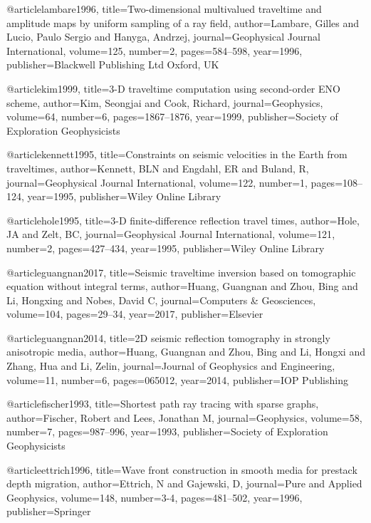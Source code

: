 @article{lambare1996,
  title={Two-dimensional multivalued traveltime and amplitude maps by uniform sampling of a ray field},
  author={Lambare, Gilles and Lucio, Paulo Sergio and Hanyga, Andrzej},
  journal={Geophysical Journal International},
  volume={125},
  number={2},
  pages={584--598},
  year={1996},
  publisher={Blackwell Publishing Ltd Oxford, UK}
}

@article{kim1999,
  title={3-D traveltime computation using second-order ENO scheme},
  author={Kim, Seongjai and Cook, Richard},
  journal={Geophysics},
  volume={64},
  number={6},
  pages={1867--1876},
  year={1999},
  publisher={Society of Exploration Geophysicists}
}

@article{kennett1995,
  title={Constraints on seismic velocities in the Earth from traveltimes},
  author={Kennett, BLN and Engdahl, ER and Buland, R},
  journal={Geophysical Journal International},
  volume={122},
  number={1},
  pages={108--124},
  year={1995},
  publisher={Wiley Online Library}
}


@article{hole1995,
  title={3-D finite-difference reflection travel times},
  author={Hole, JA and Zelt, BC},
  journal={Geophysical Journal International},
  volume={121},
  number={2},
  pages={427--434},
  year={1995},
  publisher={Wiley Online Library}
}


@article{guangnan2017,
  title={Seismic traveltime inversion based on tomographic equation without integral terms},
  author={Huang, Guangnan and Zhou, Bing and Li, Hongxing and Nobes, David C},
  journal={Computers \& Geosciences},
  volume={104},
  pages={29--34},
  year={2017},
  publisher={Elsevier}
}

@article{guangnan2014,
  title={2D seismic reflection tomography in strongly anisotropic media},
  author={Huang, Guangnan and Zhou, Bing and Li, Hongxi and Zhang, Hua and Li, Zelin},
  journal={Journal of Geophysics and Engineering},
  volume={11},
  number={6},
  pages={065012},
  year={2014},
  publisher={IOP Publishing}
}

@article{fischer1993,
  title={Shortest path ray tracing with sparse graphs},
  author={Fischer, Robert and Lees, Jonathan M},
  journal={Geophysics},
  volume={58},
  number={7},
  pages={987--996},
  year={1993},
  publisher={Society of Exploration Geophysicists}
}

@article{ettrich1996,
  title={Wave front construction in smooth media for prestack depth migration},
  author={Ettrich, N and Gajewski, D},
  journal={Pure and Applied Geophysics},
  volume={148},
  number={3-4},
  pages={481--502},
  year={1996},
  publisher={Springer}
}


